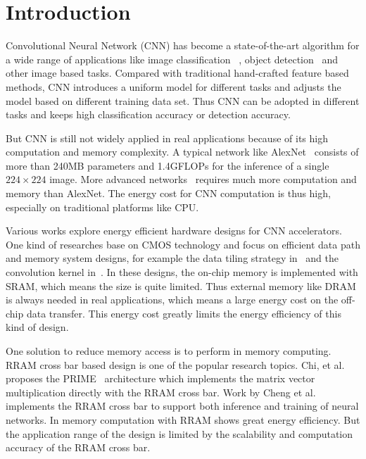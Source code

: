 \section{Introduction}

Convolutional Neural Network (CNN) has become a state-of-the-art algorithm for a wide range of applications like image classification~\cite{simonyan2014very}\cite{he2015deep} , object detection~\cite{redmon2015you} and other image based tasks. Compared with traditional hand-crafted feature based methods, CNN introduces a uniform model for different tasks and adjusts the model based on different training data set. Thus CNN can be adopted in different tasks and keeps high classification accuracy or detection accuracy.

But CNN is still not widely applied in real applications because of its high computation and memory complexity. A typical network like AlexNet~\cite{krizhevsky2012imagenet} consists of more than 240MB parameters and 1.4GFLOPs for the inference of a single $224\times 224$ image. More advanced networks~\cite{simonyan2014very}\cite{he2015deep} requires much more computation and memory than AlexNet. The energy cost for CNN computation is thus high, especially on traditional platforms like CPU.

Various works explore energy efficient hardware designs for CNN accelerators. One kind of researches base on CMOS technology and focus on efficient data path and memory system designs, for example the data tiling strategy in~\cite{zhang2015optimizing} and the convolution kernel in~\cite{qiu2016going}\cite{du2015shidiannao}. In these designs, the on-chip memory is implemented with SRAM, which means the size is quite limited. Thus external memory like DRAM is always needed in real applications, which means a large energy cost on the off-chip data transfer. This energy cost greatly limits the energy efficiency of this kind of design.

One solution to reduce memory access is to perform in memory computing. RRAM cross bar based design is one of the popular research topics. Chi, et al. proposes the PRIME~\cite{chi2016prime} architecture which implements the matrix vector multiplication directly with the RRAM cross bar. Work by Cheng et al.~\cite{cheng2017time} implements the RRAM cross bar to support both inference and training of neural networks. In memory computation with RRAM shows great energy efficiency. But the application range of the design is limited by the scalability and computation accuracy of the RRAM cross bar.

